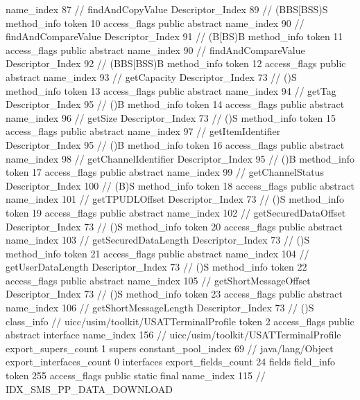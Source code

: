 {{{{{					name_index	87		// findAndCopyValue
					Descriptor_Index	89		// (BBS[BSS)S
				}
				method_info {
					token	10
					access_flags	public abstract
					name_index	90		// findAndCompareValue
					Descriptor_Index	91		// (B[BS)B
				}
				method_info {
					token	11
					access_flags	public abstract
					name_index	90		// findAndCompareValue
					Descriptor_Index	92		// (BBS[BSS)B
				}
				method_info {
					token	12
					access_flags	public abstract
					name_index	93		// getCapacity
					Descriptor_Index	73		// ()S
				}
				method_info {
					token	13
					access_flags	public abstract
					name_index	94		// getTag
					Descriptor_Index	95		// ()B
				}
				method_info {
					token	14
					access_flags	public abstract
					name_index	96		// getSize
					Descriptor_Index	73		// ()S
				}
				method_info {
					token	15
					access_flags	public abstract
					name_index	97		// getItemIdentifier
					Descriptor_Index	95		// ()B
				}
				method_info {
					token	16
					access_flags	public abstract
					name_index	98		// getChannelIdentifier
					Descriptor_Index	95		// ()B
				}
				method_info {
					token	17
					access_flags	public abstract
					name_index	99		// getChannelStatus
					Descriptor_Index	100		// (B)S
				}
				method_info {
					token	18
					access_flags	public abstract
					name_index	101		// getTPUDLOffset
					Descriptor_Index	73		// ()S
				}
				method_info {
					token	19
					access_flags	public abstract
					name_index	102		// getSecuredDataOffset
					Descriptor_Index	73		// ()S
				}
				method_info {
					token	20
					access_flags	public abstract
					name_index	103		// getSecuredDataLength
					Descriptor_Index	73		// ()S
				}
				method_info {
					token	21
					access_flags	public abstract
					name_index	104		// getUserDataLength
					Descriptor_Index	73		// ()S
				}
				method_info {
					token	22
					access_flags	public abstract
					name_index	105		// getShortMessageOffset
					Descriptor_Index	73		// ()S
				}
				method_info {
					token	23
					access_flags	public abstract
					name_index	106		// getShortMessageLength
					Descriptor_Index	73		// ()S
				}
			}
		}
		class_info {		// uicc/usim/toolkit/USATTerminalProfile
			token	2
			access_flags	public abstract interface
			name_index	156		// uicc/usim/toolkit/USATTerminalProfile
			export_supers_count	1
			supers {
				constant_pool_index	69		// java/lang/Object
			}
			export_interfaces_count	0
			interfaces {
			}
			export_fields_count	24
			fields {
			field_info {
				token	255
				access_flags	public static final
				name_index	115		// IDX_SMS_PP_DATA_DOWNLOAD
}}}}}
